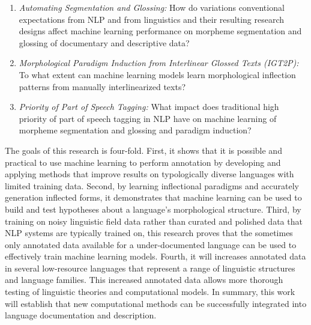 \begin{enumerate}
\item{} \emph{Automating Segmentation and Glossing:} How do variations conventional expectations from NLP and from linguistics and their resulting research designs affect machine learning performance on morpheme segmentation and glossing of documentary and descriptive data? 

\item{} \emph{Morphological Paradigm Induction from Interlinear Glossed Texts (IGT2P):} To what extent can machine learning models learn morphological inflection patterns from manually interlinearized texts?

\item \emph{Priority of Part of Speech Tagging:} 
What impact does traditional high priority of part of speech tagging in NLP have on machine learning of morpheme segmentation and glossing and paradigm induction?
\end{enumerate}



The goals of this research is four-fold. First, it shows that it is possible and practical to use machine learning to perform annotation by developing and applying methods that improve results on typologically diverse languages with limited training data. Second, by learning inflectional paradigms and accurately generation inflected forms, it demonstrates that machine learning can be used to build and test hypotheses about a language's morphological structure. Third, by training on noisy linguistic field data rather than curated and polished data that NLP systems are typically trained on, this research proves that the sometimes only annotated data available for a under-documented language can be used to effectively train machine learning models. 
Fourth,  it will increases annotated data in several low-resource languages that represent a range of linguistic structures and language families. This increased annotated data allows more thorough testing of linguistic theories and computational models.
In summary, this work will establish that new computational methods can be successfully integrated into language documentation and description. 

